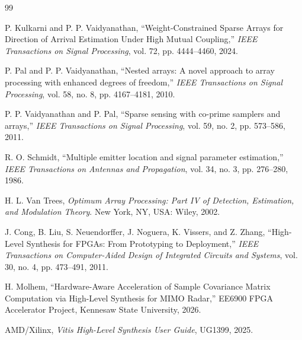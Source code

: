 \documentclass[11pt,letterpaper]{article}
\begin{document}
\begin{thebibliography}{99}

P. Kulkarni and P. P. Vaidyanathan, ``Weight-Constrained Sparse Arrays for Direction of Arrival Estimation Under High Mutual Coupling,'' \emph{IEEE Transactions on Signal Processing}, vol. 72, pp. 4444--4460, 2024.

P. Pal and P. P. Vaidyanathan, ``Nested arrays: A novel approach to array processing with enhanced degrees of freedom,'' \emph{IEEE Transactions on Signal Processing}, vol. 58, no. 8, pp. 4167--4181, 2010.

P. P. Vaidyanathan and P. Pal, ``Sparse sensing with co-prime samplers and arrays,'' \emph{IEEE Transactions on Signal Processing}, vol. 59, no. 2, pp. 573--586, 2011.

R. O. Schmidt, ``Multiple emitter location and signal parameter estimation,'' \emph{IEEE Transactions on Antennas and Propagation}, vol. 34, no. 3, pp. 276--280, 1986.

H. L. Van Trees, \emph{Optimum Array Processing: Part IV of Detection, Estimation, and Modulation Theory}. New York, NY, USA: Wiley, 2002.

J. Cong, B. Liu, S. Neuendorffer, J. Noguera, K. Vissers, and Z. Zhang, ``High-Level Synthesis for FPGAs: From Prototyping to Deployment,'' \emph{IEEE Transactions on Computer-Aided Design of Integrated Circuits and Systems}, vol. 30, no. 4, pp. 473--491, 2011.

H. Molhem, ``Hardware-Aware Acceleration of Sample Covariance Matrix Computation via High-Level Synthesis for MIMO Radar,'' EE6900 FPGA Accelerator Project, Kennesaw State University, 2026.

AMD/Xilinx, \emph{Vitis High-Level Synthesis User Guide}, UG1399, 2025.

\end{thebibliography}
\end{document}
